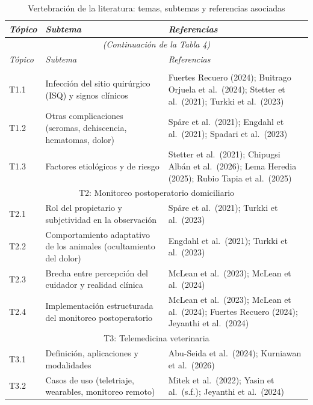 \documentclass[stu, spanish]{apa7}
\begin{document}
\begin{longtable}{@{}lp{4.5cm}p{6.5cm}@{}}
\caption{Vertebraci\'{o}n de la literatura: temas, subtemas y referencias asociadas} \label{tab:vertebracion} \\
\toprule
\textit{T\'{o}pico} & \textit{Subtema} & \textit{Referencias} \\
\midrule
\endfirsthead
\multicolumn{3}{c}{\textit{(Continuaci\'{o}n de la Tabla 4)}} \\
\toprule
\textit{T\'{o}pico} & \textit{Subtema} & \textit{Referencias} \\
\midrule
\endhead
\bottomrule
\endfoot
\multicolumn{3}{c}{T1: Complicaciones postoperatorias en veterinaria} \\
\midrule
T1.1 & Infecci\'{o}n del sitio quir\'{u}rgico (ISQ) y signos cl\'{i}nicos & Fuertes Recuero (2024); Buitrago Orjuela et al.\ (2024); Stetter et al.\ (2021); Turkki et al.\ (2023) \\
T1.2 & Otras complicaciones (seromas, dehiscencia, hematomas, dolor) & Sp\r{a}re et al.\ (2021); Engdahl et al.\ (2021); Spadari et al.\ (2023) \\
T1.3 & Factores etiol\'{o}gicos y de riesgo & Stetter et al.\ (2021); Chipugsi Alb\'{a}n et al.\ (2026); Lema Heredia (2025); Rubio Tapia et al.\ (2025) \\
\midrule
\multicolumn{3}{c}{T2: Monitoreo postoperatorio domiciliario} \\
\midrule
T2.1 & Rol del propietario y subjetividad en la observaci\'{o}n & Sp\r{a}re et al.\ (2021); Turkki et al.\ (2023) \\
T2.2 & Comportamiento adaptativo de los animales (ocultamiento del dolor) & Engdahl et al.\ (2021); Turkki et al.\ (2023) \\
T2.3 & Brecha entre percepci\'{o}n del cuidador y realidad cl\'{i}nica & McLean et al.\ (2023); McLean et al.\ (2024) \\
T2.4 & Implementaci\'{o}n estructurada del monitoreo postoperatorio & McLean et al.\ (2023); McLean et al.\ (2024); Fuertes Recuero (2024); Jeyanthi et al.\ (2024) \\
\midrule
\multicolumn{3}{c}{T3: Telemedicina veterinaria} \\
\midrule
T3.1 & Definici\'{o}n, aplicaciones y modalidades & Abu-Seida et al.\ (2024); Kurniawan et al.\ (2026) \\
T3.2 & Casos de uso (teletriaje, wearables, monitoreo remoto) & Mitek et al.\ (2022); Yasin et al.\ (s.f.); Jeyanthi et al.\ (2024) \\

\end{longtable}
\end{document}
